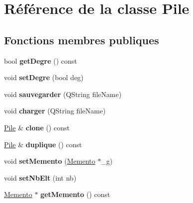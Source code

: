 \hypertarget{class_pile}{\section{Référence de la classe Pile}
\label{class_pile}
}
\subsection*{Fonctions membres publiques}
\begin{DoxyCompactItemize}
\item 
\hypertarget{class_pile_ad65ece3020d11d8d58c2781150cdca44}{bool {\bfseries get\-Degre} () const }\label{class_pile_ad65ece3020d11d8d58c2781150cdca44}

\item 
\hypertarget{class_pile_abf4931bd506e4c892949c7b7b70fd097}{void {\bfseries set\-Degre} (bool deg)}\label{class_pile_abf4931bd506e4c892949c7b7b70fd097}

\item 
\hypertarget{class_pile_a555732cb1e82480697663ba299592d9d}{void {\bfseries sauvegarder} (Q\-String file\-Name)}\label{class_pile_a555732cb1e82480697663ba299592d9d}

\item 
\hypertarget{class_pile_a18026c4fab8cd91ddcec265c47039171}{void {\bfseries charger} (Q\-String file\-Name)}\label{class_pile_a18026c4fab8cd91ddcec265c47039171}

\item 
\hypertarget{class_pile_a13e1620ba0de2d1cd4b1f66f5356a8b4}{\hyperlink{class_pile}{Pile} \& {\bfseries clone} () const }\label{class_pile_a13e1620ba0de2d1cd4b1f66f5356a8b4}

\item 
\hypertarget{class_pile_aee5282e29d14470c8805b62830207306}{\hyperlink{class_pile}{Pile} \& {\bfseries duplique} () const }\label{class_pile_aee5282e29d14470c8805b62830207306}

\item 
\hypertarget{class_pile_a9105d1958c28860a1ed4b609c4701a41}{void {\bfseries set\-Memento} (\hyperlink{class_memento}{Memento} $\ast$\-\_\-g)}\label{class_pile_a9105d1958c28860a1ed4b609c4701a41}

\item 
\hypertarget{class_pile_a09fd751d9d6d0d3c861f97405756db56}{void {\bfseries set\-Nb\-Elt} (int nb)}\label{class_pile_a09fd751d9d6d0d3c861f97405756db56}

\item 
\hypertarget{class_pile_abf056806ae413b53d6ab9d6b7bbb6218}{\hyperlink{class_memento}{Memento} $\ast$ {\bfseries get\-Memento} () const }\label{class_pile_abf056806ae413b53d6ab9d6b7bbb6218}


\end{DoxyCompactItemize}
